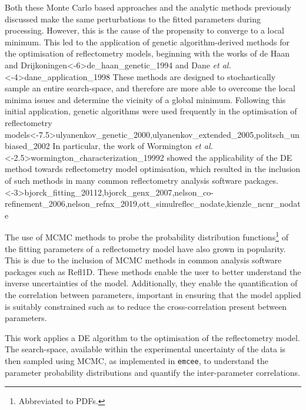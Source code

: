 Both these Monte Carlo based approaches and the analytic methods previously discussed make the same perturbations to the fitted parameters during processing.
However, this is the cause of the propensity to converge to a local minimum.
This led to the application of genetic algorithm-derived methods for the optimisation of reflectometry models, beginning with the works of de Haan and Drijkoningen\sidecite<-6\baselineskip>{de_haan_genetic_1994} and Dane \emph{et al.}\sidecite<-4\baselineskip>{dane_application_1998}
These methods are designed to stochastically sample an entire search-space, and therefore are more able to overcome the local minima issues and determine the vicinity of a global minimum.
Following this initial application, genetic algorithms were used frequently in the optimisation of reflectometry models\sidecite<-7.5\baselineskip>{ulyanenkov_genetic_2000,ulyanenkov_extended_2005,politsch_unbiased_2002}
In particular, the work of Wormington \emph{et al.}\sidecite<-2.5\baselineskip>{wormington_characterization_19992} showed the applicability of the DE method towards reflectometry model optimisation, which resulted in the inclusion of such methods in many common reflectometry analysis software packages.\sidecite<-3\baselineskip>{bjorck_fitting_20112,bjorck_genx_2007,nelson_co-refinement_2006,nelson_refnx_2019,ott_simulreflec_nodate,kienzle_ncnr_nodate}

The use of MCMC methods to probe the probability distribution functions\footnote{Abbreviated to PDFs.} of the fitting parameters of a reflectometry model have also grown in popularity.\autocite{gil_limitations_2012,hoogerheide_structure_2018,owejan_solid_2012,heinrich_myristoylation_2014}
This is due to the inclusion of MCMC methods in common analysis software packages such as Refl1D.\autocite{kienzle_ncnr_nodate}
These methods enable the user to better understand the inverse uncertainties of the model.
Additionally, they enable the quantification of the correlation between parameters, important in ensuring that the model applied is suitably constrained such as to reduce the cross-correlation present between parameters.\autocite{nelson_co-refinement_2006}

This work applies a DE algorithm\autocite{storn_differential_1997,jones_scipy_nodate} to the optimisation of the reflectometry model.
The search-space, available within the experimental uncertainty of the data is then sampled using MCMC, as implemented in \texttt{emcee},\autocite{foreman-mackey_emcee_2013} to understand the parameter probability distributions and quantify the inter-parameter correlations.


